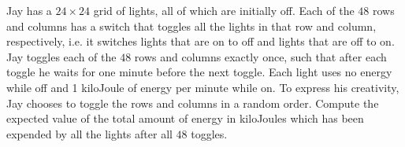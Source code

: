 Jay has a $24\times 24$ grid of lights, all of which are initially off. Each of the $48$ rows and columns has a switch that toggles all the lights in that row and column, respectively, i.e. it switches lights that are on to off and lights that are off to on. Jay toggles each of the $48$ rows and columns exactly once, such that after each toggle he waits for one minute before the next toggle. Each light uses no energy while off and 1 kiloJoule of energy per minute while on. To express his creativity, Jay chooses to toggle the rows and columns in a random order. Compute the expected value of the total amount of energy in kiloJoules which has been expended by all the lights after all $48$ toggles.
